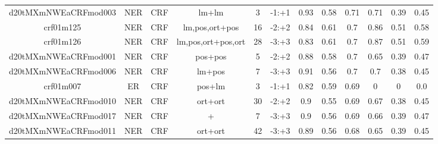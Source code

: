 \documentclass[a4paper]{article}
\begin{document}
\begin{landscape}
\begin{center}
\begin{tabular}{ |c|c|c|c|c|c|c|c|c|c|c|c|}
 	
 		
 		\small{ d20tMXmNWEaCRFmod003 } & NER & CRF & lm+lm  &  3 &  -1:+1  &  0.93 & 0.58 & 0.71  &  0.71 & 0.39 & 0.45 \\
 		

 	
 
 	
 		
 		\small{ crf01m125 } & NER & CRF & lm,pos,ort+pos  &  16 &  -2:+2  &  0.84 & 0.61 & 0.7  &  0.86 & 0.51 & 0.58 \\
 		

 	
 
 	
 		
 		\small{ crf01m126 } & NER & CRF & lm,pos,ort+pos,ort  &  28 &  -3:+3  &  0.83 & 0.61 & 0.7  &  0.87 & 0.51 & 0.59 \\
 		

 	
 
 	
 		
 		\small{ d20tMXmNWEaCRFmod001 } & NER & CRF & pos+pos  &  5 &  -2:+2  &  0.88 & 0.58 & 0.7  &  0.65 & 0.39 & 0.47 \\
 		

 	
 
 	
 		
 		\small{ d20tMXmNWEaCRFmod006 } & NER & CRF & lm+pos  &  7 &  -3:+3  &  0.91 & 0.56 & 0.7  &  0.7 & 0.38 & 0.45 \\
 		

 	
 
 	
 		
 		\small{ crf01m007 } & ER & CRF & pos+lm  &  3 &  -1:+1  &  0.82 & 0.59 & 0.69  &  0 & 0 & 0.0 \\
 		

 	
 
 	
 		
 		\small{ d20tMXmNWEaCRFmod010 } & NER & CRF & ort+ort  &  30 &  -2:+2  &  0.9 & 0.55 & 0.69  &  0.67 & 0.38 & 0.45 \\
 		

 	
 
 	
 		
 		\small{ d20tMXmNWEaCRFmod017 } & NER & CRF & +  &  7 &  -3:+3  &  0.9 & 0.56 & 0.69  &  0.66 & 0.39 & 0.47 \\
 		

 	
 
 	
 		
 		\small{ d20tMXmNWEaCRFmod011 } & NER & CRF & ort+ort  &  42 &  -3:+3  &  0.89 & 0.56 & 0.68  &  0.65 & 0.39 & 0.45 \\
 		


\end{tabular}
\end{center}
\end{landscape}
\end{document}

